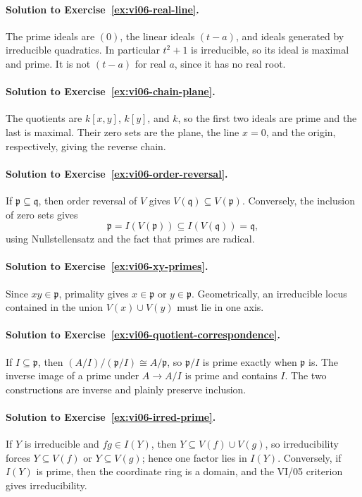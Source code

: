 \paragraph{Solution to Exercise~\ref{ex:vi06-real-line}.}
The prime ideals are \((0)\), the linear ideals \((t-a)\), and ideals generated by
irreducible quadratics.  In particular \(t^2+1\) is irreducible, so its ideal is maximal and
prime.  It is not \((t-a)\) for real \(a\), since it has no real root.

\paragraph{Solution to Exercise~\ref{ex:vi06-chain-plane}.}
The quotients are \(k[x,y]\), \(k[y]\), and \(k\), so the first two ideals are prime and
the last is maximal.  Their zero sets are the plane, the line \(x=0\), and the origin,
respectively, giving the reverse chain.

\paragraph{Solution to Exercise~\ref{ex:vi06-order-reversal}.}
If \(\mathfrak p\subseteq\mathfrak q\), then order reversal of \(V\) gives
\(V(\mathfrak q)\subseteq V(\mathfrak p)\).  Conversely, the inclusion of zero sets gives
\[
\mathfrak p=I(V(\mathfrak p))\subseteq I(V(\mathfrak q))=\mathfrak q,
\]
using Nullstellensatz and the fact that primes are radical.

\paragraph{Solution to Exercise~\ref{ex:vi06-xy-primes}.}
Since \(xy\in\mathfrak p\), primality gives \(x\in\mathfrak p\) or
\(y\in\mathfrak p\).  Geometrically, an irreducible locus contained in the union
\(V(x)\cup V(y)\) must lie in one axis.

\paragraph{Solution to Exercise~\ref{ex:vi06-quotient-correspondence}.}
If \(I\subseteq\mathfrak p\), then
\((A/I)/(\mathfrak p/I)\cong A/\mathfrak p\), so \(\mathfrak p/I\) is prime exactly when
\(\mathfrak p\) is.  The inverse image of a prime under \(A\to A/I\) is prime and contains
\(I\).  The two constructions are inverse and plainly preserve inclusion.

\paragraph{Solution to Exercise~\ref{ex:vi06-irred-prime}.}
If \(Y\) is irreducible and \(fg\in I(Y)\), then
\(Y\subseteq V(f)\cup V(g)\), so irreducibility forces \(Y\subseteq V(f)\) or
\(Y\subseteq V(g)\); hence one factor lies in \(I(Y)\).  Conversely, if \(I(Y)\) is prime,
then the coordinate ring is a domain, and the VI/05 criterion gives irreducibility.

